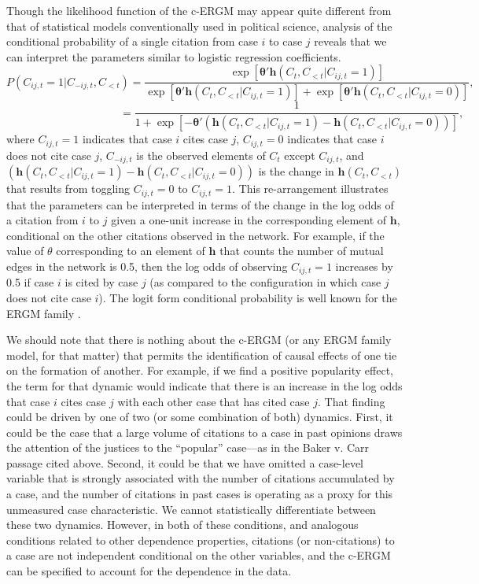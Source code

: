 \documentclass[headsepline=true, abstracton]{scrartcl}
\begin{document}
Though the likelihood function of the c-ERGM may appear quite different from that of statistical models conventionally used in political science, analysis of the conditional probability of a single citation from case $i$ to case $j$ reveals that we can interpret the parameters similar to logistic regression coefficients. $$ P(C_{ij,t} = 1 | C_{-ij,t}, C_{ < t}) = \frac{\exp \left[ {\bm{\theta}'\bm{h}(C_{t},C_{<t}| C_{ij,t} = 1) } \right]}{ \exp \left[ {\bm{\theta}'\bm{h}(C_{t},C_{<t}| C_{ij,t} = 1) } \right] + \exp \left[ {\bm{\theta}'\bm{h}(C_{t},C_{<t}| C_{ij,t} = 0) } \right]}, $$ $$ \text{~~~~~~~~~~~~~~~~~~~~~~~~~~~~~~~} = \frac{1}{ 1 + \exp \left[ - {\bm{\theta}'\left(\bm{h}(C_{t},C_{<t}| C_{ij,t} = 1) - \bm{h}(C_{t},C_{<t}| C_{ij,t} = 0)\right)} \right]}, $$
where $C_{ij,t} = 1$ indicates that case $i$ cites case $j$, $C_{ij,t} = 0$ indicates that case $i$ does not cite case $j$, $C_{-ij,t}$ is the observed elements of $C_{t}$ except $C_{ij,t}$, and $\left(\bm{h}(C_{t},C_{<t}| C_{ij,t} = 1) - \bm{h}(C_{t},C_{<t}| C_{ij,t} = 0)\right)$ is the change in $\bm{h}(C_{t},C_{<t})$ that results from toggling $C_{ij,t} = 0$ to $C_{ij,t} = 1$. This re-arrangement illustrates that the parameters can be interpreted in terms of the change in the log odds of a citation from $i$ to $j$ given a one-unit increase in the corresponding element of $\bm{h}$, conditional on the other citations observed in the network. For example, if the value of $\theta$ corresponding to an element of $\bm{h}$ that counts the number of mutual edges in the network is 0.5, then the log odds of observing $C_{ij,t} = 1$ increases by 0.5 if case $i$ is cited by case $j$ (as compared to the configuration in which case $j$ does not cite case $i$). The logit form conditional probability is well known for the ERGM family \citep{goodreau2009birds}.

We should note that there is nothing about the c-ERGM (or any ERGM family model, for that matter) that permits the identification of causal effects of one tie on the formation of another. For example, if we find a positive popularity effect, the term for that dynamic would indicate that there is an increase in the log odds that case $i$ cites case $j$ with each other case that has cited case $j$.  That finding could be driven by one of two (or some combination of both) dynamics. First, it could be the case that a large volume of citations to a case in past opinions draws the attention of the justices to the ``popular'' case---as in the Baker v. Carr passage cited above. Second, it could be that we have omitted a case-level variable that is strongly associated with the number of citations accumulated by a case, and the number of citations in past cases is operating as a proxy for this unmeasured case characteristic. We cannot statistically differentiate between these two dynamics. However, in both of these conditions, and analogous conditions related to other dependence properties, citations (or non-citations) to a case are not independent conditional on the other variables, and the c-ERGM can be specified to account for the dependence in the data.
\end{document}
